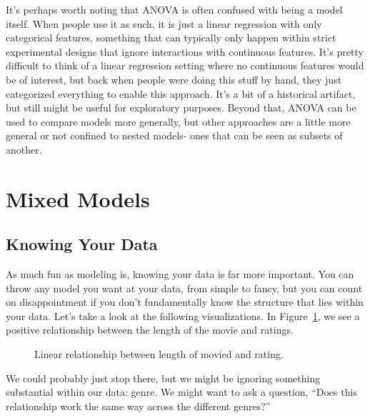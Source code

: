 \documentclass[
  letterpaper,
]{krantz}
\begin{document}
It's perhaps worth noting that ANOVA is often confused with being a
model itself. When people use it as such, it is just a linear regression
with only categorical features, something that can typically only happen
within strict experimental designs that ignore interactions with
continuous features. It's pretty difficult to think of a linear
regression setting where no continuous features would be of interest,
but back when people were doing this stuff by hand, they just
categorized everything to enable this approach. It's a bit of a
historical artifact, but still might be useful for exploratory purposes.
Beyond that, ANOVA can be used to compare models more generally, but
other approaches are a little more general or not confined to nested
models- ones that can be seen as subsets of another.

\section{Mixed Models}\label{sec-mixed-models}

\subsection{Knowing Your Data}\label{sec-mixed-models-knowing}

As much fun as modeling is, knowing your data is far more important. You
can throw any model you want at your data, from simple to fancy, but you
can count on disappointment if you don't fundamentally know the
structure that lies within your data. Let's take a look at the following
visualizations. In Figure~\ref{fig-length-release-rating}, we see a
positive relationship between the length of the movie and ratings.

\begin{figure}[H]


\caption{\label{fig-length-release-rating}Linear relationship between
length of movied and rating.}

\end{figure}%

We could probably just stop there, but we might be ignoring something
substantial within our data: genre. We might want to ask a question,
``Does this relationship work the same way across the different
genres?''
\end{document}
